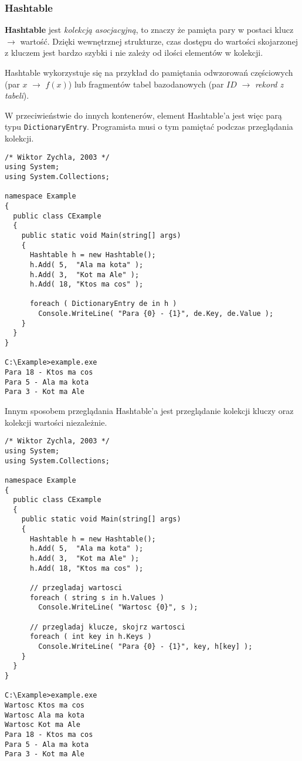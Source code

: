 \subsubsection{{\bf Hashtable}}

{\bf Hashtable} jest {\em kolekcją asocjacyjną}, to znaczy że pamięta pary w postaci klucz $\rightarrow$ wartość.
Dzięki wewnętrznej strukturze, czas dostępu do wartości skojarzonej z kluczem jest bardzo szybki i nie
zależy od ilości elementów w kolekcji. 

Hashtable wykorzystuje się na przykład do pamiętania odwzorowań częściowych (par $x$ $\rightarrow$ $f(x)$) lub
fragmentów tabel bazodanowych (par $ID$ $\rightarrow$ {\em rekord z tabeli}).

W przeciwieństwie do innych kontenerów, element Hashtable'a jest więc parą typu {\tt DictionaryEntry}. 
Programista musi o tym pamiętać podczas przeglądania kolekcji.

\begin{scriptsize}
\begin{verbatim}
/* Wiktor Zychla, 2003 */
using System;
using System.Collections;

namespace Example
{
  public class CExample 
  {
    public static void Main(string[] args)
    {
      Hashtable h = new Hashtable();
      h.Add( 5,  "Ala ma kota" );
      h.Add( 3,  "Kot ma Ale" );
      h.Add( 18, "Ktos ma cos" );

      foreach ( DictionaryEntry de in h )
        Console.WriteLine( "Para {0} - {1}", de.Key, de.Value );
    }
  }
}

C:\Example>example.exe
Para 18 - Ktos ma cos
Para 5 - Ala ma kota
Para 3 - Kot ma Ale
\end{verbatim}
\end{scriptsize}

Innym sposobem przeglądania Hashtable'a jest przeglądanie kolekcji kluczy oraz kolekcji wartości niezależnie.

\begin{scriptsize}
\begin{verbatim}
/* Wiktor Zychla, 2003 */
using System;
using System.Collections;

namespace Example
{
  public class CExample 
  {
    public static void Main(string[] args)
    {
      Hashtable h = new Hashtable();
      h.Add( 5,  "Ala ma kota" );
      h.Add( 3,  "Kot ma Ale" );
      h.Add( 18, "Ktos ma cos" );

      // przegladaj wartosci
      foreach ( string s in h.Values )
        Console.WriteLine( "Wartosc {0}", s );

      // przegladaj klucze, skojrz wartosci
      foreach ( int key in h.Keys )
        Console.WriteLine( "Para {0} - {1}", key, h[key] );
    }
  }
}

C:\Example>example.exe
Wartosc Ktos ma cos
Wartosc Ala ma kota
Wartosc Kot ma Ale
Para 18 - Ktos ma cos
Para 5 - Ala ma kota
Para 3 - Kot ma Ale
\end{verbatim}
\end{scriptsize}


